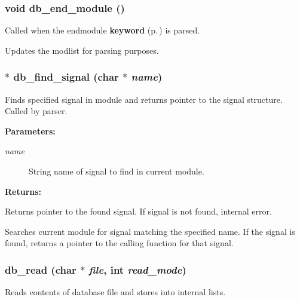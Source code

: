 \subsubsection{\setlength{\rightskip}{0pt plus 5cm}void db\_\-end\_\-module ()}\label{db_8h_a9}


Called when the endmodule {\bf keyword} {\rm (p.\,\pageref{structkeyword})} is parsed.

Updates the modlist for parsing purposes. 
\subsubsection{$\ast$ db\_\-find\_\-signal (char $\ast$ {\em name})}\label{db_8h_a10}


Finds specified signal in module and returns pointer to the signal structure. Called by parser.

\begin{Desc}
\item[{\bf Parameters: }]\par
\begin{description}
\item[
{\em name}]String name of signal to find in current module.

\end{description}
\end{Desc}
\begin{Desc}
\item[{\bf Returns: }]\par
Returns pointer to the found signal. If signal is not found, internal error.

\end{Desc}
Searches current module for signal matching the specified name. If the signal is found, returns a pointer to the calling function for that signal. 
\subsubsection{ db\_\-read (char $\ast$ {\em file}, int {\em read\_\-mode})}\label{db_8h_a1}


Reads contents of database file and stores into internal lists.

